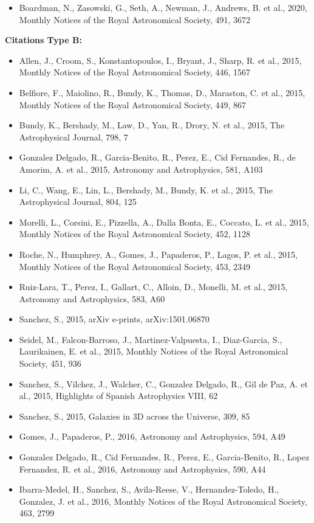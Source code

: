 \documentclass{letter}
\begin{document}
\begin{enumerate}
\begin{itemize}
\item Boardman, N., Zasowski, G., Seth, A., Newman, J., Andrews, B. et al., 2020, Monthly Notices of the Royal Astronomical Society, 491, 3672
\end{itemize}
{\bf Citations Type B:}
\begin{itemize}
\item Allen, J., Croom, S., Konstantopoulos, I., Bryant, J., Sharp, R. et al., 2015, Monthly Notices of the Royal Astronomical Society, 446, 1567
\item Belfiore, F., Maiolino, R., Bundy, K., Thomas, D., Maraston, C. et al., 2015, Monthly Notices of the Royal Astronomical Society, 449, 867
\item Bundy, K., Bershady, M., Law, D., Yan, R., Drory, N. et al., 2015, The Astrophysical Journal, 798, 7
\item Gonzalez Delgado, R., Garcia-Benito, R., Perez, E., Cid Fernandes, R., de Amorim, A. et al., 2015, Astronomy and Astrophysics, 581, A103
\item Li, C., Wang, E., Lin, L., Bershady, M., Bundy, K. et al., 2015, The Astrophysical Journal, 804, 125
\item Morelli, L., Corsini, E., Pizzella, A., Dalla Bonta, E., Coccato, L. et al., 2015, Monthly Notices of the Royal Astronomical Society, 452, 1128
\item Roche, N., Humphrey, A., Gomes, J., Papaderos, P., Lagos, P. et al., 2015, Monthly Notices of the Royal Astronomical Society, 453, 2349
\item Ruiz-Lara, T., Perez, I., Gallart, C., Alloin, D., Monelli, M. et al., 2015, Astronomy and Astrophysics, 583, A60
\item Sanchez, S., 2015, arXiv e-prints, arXiv:1501.06870
\item Seidel, M., Falcon-Barroso, J., Martinez-Valpuesta, I., Diaz-Garcia, S., Laurikainen, E. et al., 2015, Monthly Notices of the Royal Astronomical Society, 451, 936
\item Sanchez, S., Vilchez, J., Walcher, C., Gonzalez Delgado, R., Gil de Paz, A. et al., 2015, Highlights of Spanish Astrophysics VIII, 62
\item Sanchez, S., 2015, Galaxies in 3D across the Universe, 309, 85
\item Gomes, J., Papaderos, P., 2016, Astronomy and Astrophysics, 594, A49
\item Gonzalez Delgado, R., Cid Fernandes, R., Perez, E., Garcia-Benito, R., Lopez Fernandez, R. et al., 2016, Astronomy and Astrophysics, 590, A44
\item Ibarra-Medel, H., Sanchez, S., Avila-Reese, V., Hernandez-Toledo, H., Gonzalez, J. et al., 2016, Monthly Notices of the Royal Astronomical Society, 463, 2799

\end{itemize}
\end{enumerate}
\end{document}

